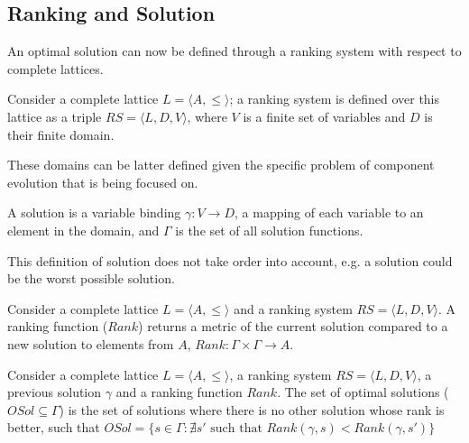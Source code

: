 \subsection{Ranking and Solution}
An optimal solution can now be defined through a ranking system with respect to complete lattices.

\begin{defs}
Consider a complete lattice $L = \langle A, \leq \rangle$; 
a ranking system is defined over this lattice as a triple $RS = \langle L, D, V \rangle$, 
where $V$ is a finite set of variables and $D$ is their finite domain.
\end{defs}

These domains can be latter defined given the specific problem of component evolution that is being focused on.

\begin{defs}
A solution is a variable binding $\gamma: V \rightarrow D$, a mapping of each variable to an element in the domain,
and $\Gamma$ is the set of all solution functions.
\end{defs}

This definition of solution does not take order into account, e.g. a solution could be the worst possible solution.

\begin{defs}
Consider a complete lattice $L = \langle A, \leq \rangle$ and a ranking system $RS = \langle L, D, V \rangle$.
A ranking function ($Rank$) returns a metric of the current solution compared to a new solution to elements from $A$,
$Rank: \Gamma \times \Gamma \rightarrow A$.
\end{defs}

\begin{defs}
Consider a complete lattice $L = \langle A, \leq \rangle$, a ranking system $RS = \langle L, D, V \rangle$, a previous solution $\gamma$ and a ranking function $Rank$.
The set of optimal solutions ($OSol \subseteq \Gamma$) is the set of solutions where there is no other solution whose rank is better,
such that $OSol = \{ s \in \Gamma : \nexists s' \mbox{ such that } Rank(\gamma,s) < Rank(\gamma,s')\}$
\end{defs}

